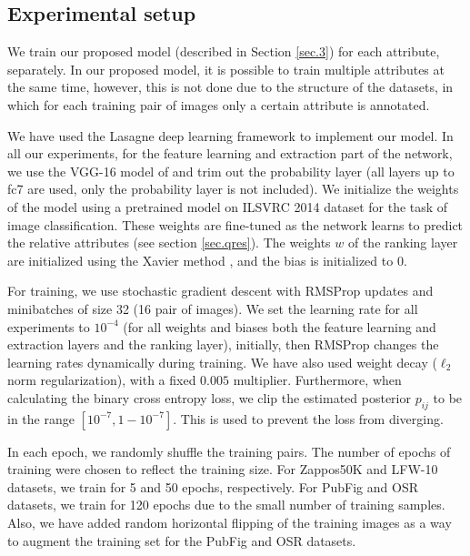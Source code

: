 \documentclass[runningheads]{llncs}
\begin{document}
\subsection{Experimental setup}
We train our proposed model (described in Section \ref{sec.3}) for each attribute, separately. In our proposed model, it is possible  to train multiple attributes at the same time, however, this is not done due to the structure of the datasets, in which for each training pair of images only a certain attribute is annotated.

We have used the Lasagne \cite{lasagne} deep learning framework to implement our model.
In all our experiments, for the feature learning and extraction part of the network,
we use the VGG-16 model of \cite{verydeep} and trim out the probability layer (all layers up to fc7 are used, only the probability layer is not included).
We initialize the weights of the model using a pretrained model on ILSVRC 2014 dataset \cite{ilsvrc2014} for the task of image classification. These weights are fine-tuned as the network learns to predict the relative attributes (see section \ref{sec.qres}). The weights $w$ of the ranking layer are initialized using the Xavier method \cite{glorot}, and the bias is initialized to 0.

For training, we use stochastic gradient descent with RMSProp \cite{Tieleman2012} updates and minibatches of size 32 (16 pair of images).
We set the learning rate for all experiments to $10^{-4}$ (for all weights and biases both the feature learning and extraction layers and the ranking layer), initially, then RMSProp changes the learning rates dynamically during training. We have also used weight decay ($\ell_2$ norm regularization), with a fixed $0.005$ multiplier. Furthermore, when calculating the binary cross entropy loss, we clip the estimated posterior $p_{ij}$ to be in the range $[10^{-7}, 1 - 10^{-7}]$. This is used to prevent the loss from diverging.

In each epoch, we randomly shuffle the training pairs. The number of epochs of training were chosen to reflect the training size. For Zappos50K and LFW-10 datasets, we train for 5 and 50 epochs, respectively. For PubFig and OSR datasets, we train for 120 epochs due to the small number of training samples. Also, we have added random horizontal flipping of the training images as a way to augment the training set for the PubFig and OSR datasets.
\end{document}
